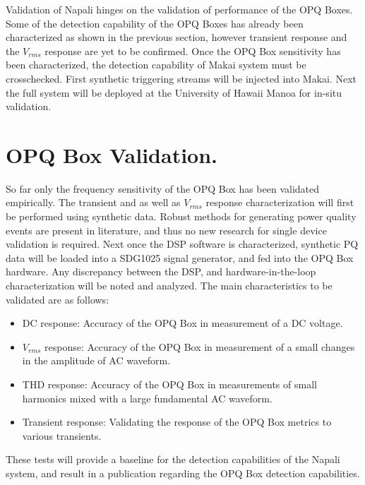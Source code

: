 Validation of Napali hinges on the validation of performance of the OPQ Boxes. Some of the detection capability of the OPQ Boxes has already been characterized as shown in the previous section, however transient response and the $V_{rms}$ response are yet to be confirmed. Once the OPQ Box sensitivity has been characterized, the detection capability of Makai system must be crosschecked. First synthetic triggering streams will be injected into Makai. Next the full system will be deployed at the University of Hawaii Manoa for in-situ validation.

\section{OPQ Box Validation.}
So far only the frequency sensitivity of the OPQ Box has been validated empirically. The transient and as well as $V_{rms}$ response characterization will first be performed using synthetic data. Robust methods for generating power quality events are present in literature, and thus no new research for single device validation is required.\cite{kumar2015power}\cite{tan2013simulation} Next once the DSP software is characterized, synthetic PQ data will be loaded into a SDG1025 signal generator, and fed into the OPQ Box hardware. Any discrepancy between the DSP, and hardware-in-the-loop characterization will be noted and analyzed. The main characteristics to be validated are as follows:
\begin{itemize}
  \item{DC response:} Accuracy of the OPQ Box in measurement of a DC voltage.
  \item{$V_{rms}$ response:} Accuracy of the OPQ Box in measurement of a small changes in the amplitude of AC waveform.
  \item{THD response:} Accuracy of the OPQ Box in measurements of small harmonics mixed with a large fundamental AC waveform.
  \item{Transient response:} Validating the response of the OPQ Box metrics to various transients.
\end{itemize} 
These tests will provide a baseline for the detection capabilities of the Napali system, and result in a publication regarding the OPQ Box detection capabilities.

